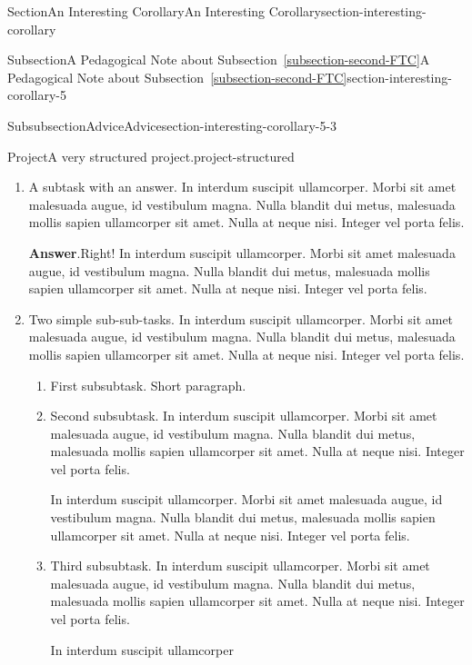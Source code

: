 \documentclass[twoside,10pt,]{article}
\newcommand{\blocktitlefont}{\relax}
\newcommand{\xreffont}{\relax}
\numberwithin{equation}{section}
\begin{document}
\begin{sectionptx}{Section}{An Interesting Corollary}{}{An Interesting Corollary}{}{}{section-interesting-corollary}
\begin{subsectionptx}{Subsection}{A Pedagogical Note about Subsection~{\xreffont\ref*{subsection-second-FTC}}}{}{A Pedagogical Note about Subsection~{\xreffont\ref*{subsection-second-FTC}}}{}{}{section-interesting-corollary-5}
\begin{subsubsectionptx}{Subsubsection}{Advice}{}{Advice}{}{}{section-interesting-corollary-5-3}
\begin{project}{Project}{A very structured project.}{project-structured}
\begin{enumerate}[font=\bfseries,label=(\alph*),ref=\alph*]
\begin{enumerate}[font=\bfseries,label=(\roman*),ref=\theenumi.\roman*]
\begin{solutionproof}{Proof}
In interdum suscipit ullamcorper. Morbi sit amet malesuada augue, id vestibulum magna. Nulla blandit dui metus, malesuada mollis sapien ullamcorper sit amet. Nulla at neque nisi. Integer vel porta felis.%
\end{solutionproof}
And a bit more to say.%
\item{}A subtask with an answer.  In interdum suscipit ullamcorper. Morbi sit amet malesuada augue, id vestibulum magna. Nulla blandit dui metus, malesuada mollis sapien ullamcorper sit amet. Nulla at neque nisi. Integer vel porta felis.%
\par\smallskip%
\noindent\textbf{\blocktitlefont Answer}.\hypertarget{project-structured-6-3-2}{}\quad{}Right!  In interdum suscipit ullamcorper. Morbi sit amet malesuada augue, id vestibulum magna. Nulla blandit dui metus, malesuada mollis sapien ullamcorper sit amet. Nulla at neque nisi. Integer vel porta felis.%
\item\label{project-task-level-two}Two simple sub-sub-tasks.  In interdum suscipit ullamcorper. Morbi sit amet malesuada augue, id vestibulum magna. Nulla blandit dui metus, malesuada mollis sapien ullamcorper sit amet. Nulla at neque nisi. Integer vel porta felis.%
\begin{enumerate}[font=\bfseries,label=(\Alph*),ref=\theenumi.\theenumii.\Alph*]%
\item{}First subsubtask.  Short paragraph.%
\item{}Second subsubtask.  In interdum suscipit ullamcorper. Morbi sit amet malesuada augue, id vestibulum magna. Nulla blandit dui metus, malesuada mollis sapien ullamcorper sit amet. Nulla at neque nisi. Integer vel porta felis.%
\par
In interdum suscipit ullamcorper. Morbi sit amet malesuada augue, id vestibulum magna. Nulla blandit dui metus, malesuada mollis sapien ullamcorper sit amet. Nulla at neque nisi. Integer vel porta felis.%
\item\label{deep-terminal-task}Third subsubtask.  In interdum suscipit ullamcorper. Morbi sit amet malesuada augue, id vestibulum magna. Nulla blandit dui metus, malesuada mollis sapien ullamcorper sit amet. Nulla at neque nisi. Integer vel porta felis.%
\par
In interdum suscipit ullamcorper%
\par

\end{enumerate}
\end{enumerate}
\end{enumerate}
\end{project}
\end{subsubsectionptx}
\end{subsectionptx}
\end{sectionptx}
\end{document}

